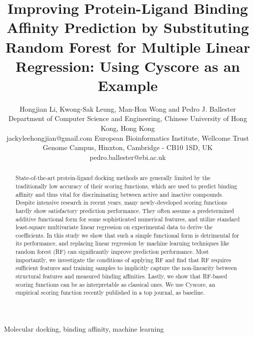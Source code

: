 \documentclass[10pt,conference,compsocconf]{IEEEtran}
\begin{document}
\title{Improving Protein-Ligand Binding Affinity Prediction by Substituting Random Forest for Multiple Linear Regression: Using Cyscore as an Example} %
\author
{
\IEEEauthorblockN
{
Hongjian Li, Kwong-Sak Leung, Man-Hon Wong and Pedro J. Ballester
\IEEEauthorblockA
{
Department of Computer Science and Engineering, Chinese University of Hong Kong, Hong Kong\\
jackyleehongjian@gmail.com
}
\IEEEauthorblockA
{
European Bioinformatics Institute, Wellcome Trust Genome Campus, Hinxton, Cambridge - CB10 1SD, UK\\
pedro.ballester@ebi.ac.uk
}
}
}
\maketitle

\begin{abstract}

State-of-the-art protein-ligand docking methods are generally limited by the traditionally low accuracy of their scoring functions, which are used to predict binding affinity and thus vital for discriminating between active and inactive compounds. Despite intensive research in recent years, many newly-developed scoring functions hardly show satisfactory prediction performance. They often assume a predetermined additive functional form for some sophisticated numerical features, and utilize standard least-square multivariate linear regression on experimental data to derive the coefficients. In this study we show that such a simple functional form is detrimental for its performance, and replacing linear regression by machine learning techniques like random forest (RF) can significantly improve prediction performance. Most importantly, we investigate the conditions of applying RF and find that RF requires sufficient features and training samples to implicitly capture the non-linearity between structural features and measured binding affinities. Lastly, we show that RF-based scoring functions can be as interpretable as classical ones. We use Cyscore, an empirical scoring function recently published in a top journal, as baseline.

\end{abstract}

\begin{IEEEkeywords}

Molecular docking, binding affinity, machine learning

\end{IEEEkeywords}
\end{document}
